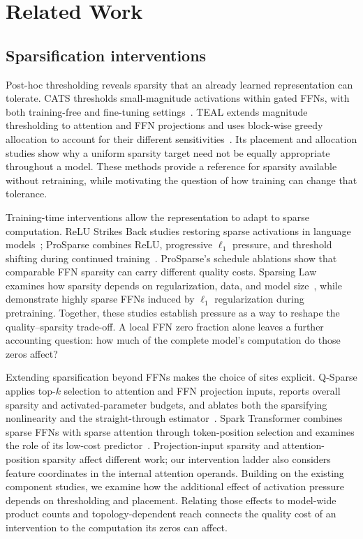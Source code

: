 \section{Related Work}
\label{sec:related-work}

\subsection{Sparsification interventions}
\label{sec:related-interventions}

Post-hoc thresholding reveals sparsity that an already learned
representation can tolerate. CATS thresholds small-magnitude activations
within gated FFNs, with both training-free and fine-tuning
settings~\citep{lee2024cats}. TEAL extends magnitude thresholding to attention
and FFN projections and uses block-wise greedy allocation to account for
their different sensitivities~\citep{liu2024teal}. Its placement and allocation
studies show why a uniform sparsity target need not be equally appropriate
throughout a model. These methods provide a reference for sparsity available
without retraining, while motivating the question of how training can change
that tolerance.

Training-time interventions allow the representation to adapt to sparse
computation. ReLU Strikes Back studies restoring sparse activations in
language models~\citep{mirzadeh2023relu}; ProSparse combines ReLU, progressive
$\ell_1$ pressure, and threshold shifting during continued
training~\citep{song2024prosparse}. ProSparse's schedule ablations show that
comparable FFN sparsity can carry different quality costs. Sparsing Law
examines how sparsity depends on regularization, data, and model
size~\citep{luo2025sparsing}, while \citet{cetin2026sparser} demonstrate highly
sparse FFNs induced by $\ell_1$ regularization during pretraining. Together,
these studies establish pressure as a way to reshape the quality--sparsity
trade-off. A local FFN zero fraction alone leaves a further accounting question:
how much of the complete model's computation do those zeros affect?

Extending sparsification beyond FFNs makes the choice of sites explicit.
Q-Sparse applies top-$k$ selection to attention and FFN projection inputs,
reports overall sparsity and activated-parameter budgets, and ablates both
the sparsifying nonlinearity and the straight-through
estimator~\citep{wang2024qsparse}. Spark Transformer combines sparse FFNs
with sparse attention through token-position selection and examines the role
of its low-cost predictor~\citep{you2025spark}.
Projection-input sparsity and attention-position sparsity affect different
work; our intervention ladder also considers feature coordinates in the
internal attention operands. Building on the existing
component studies, we examine how the additional effect of activation pressure
depends on thresholding and placement. Relating those effects to model-wide
product counts and topology-dependent reach connects the quality cost of an
intervention to the computation its zeros can affect.

